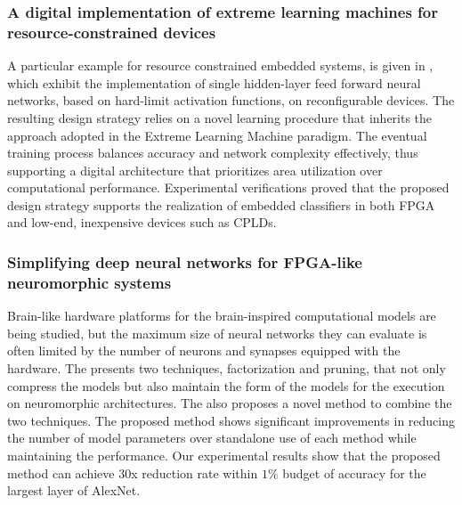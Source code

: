 \subsubsection{A digital implementation of extreme learning machines for resource-constrained devices}
A particular example for resource constrained embedded systems, is given in \cite{ragusa2018digital}, which exhibit the implementation of single hidden-layer feed forward neural networks, based on hard-limit activation functions, on reconﬁgurable devices. The resulting design strategy relies on a novel learning procedure that inherits the approach adopted in the Extreme Learning Machine paradigm. The eventual training process balances accuracy and network complexity effectively, thus supporting a digital architecture that prioritizes area utilization over computational performance. Experimental veriﬁcations proved that the proposed design strategy supports the realization of embedded classiﬁers in both FPGA and low-end, inexpensive devices such as CPLDs.

\subsubsection{Simplifying deep neural networks for FPGA-like neuromorphic systems}
Brain-like hardware platforms for the brain-inspired computational models are being studied, but the maximum size of neural networks they can evaluate is often limited by the number of neurons and synapses equipped with the hardware. The \cite{chung2018simplifying} presents two techniques, factorization and pruning, that not only compress the models but also maintain the form of the models for the execution on neuromorphic architectures. The \cite{chung2018simplifying} also proposes a novel method to combine the two techniques. The proposed method shows signiﬁcant improvements in reducing the number of model parameters over standalone use of each method while maintaining the performance. Our experimental results show that the proposed method can achieve 30x reduction rate within $1\%$ budget of accuracy for the largest layer of AlexNet.

\pagebreak